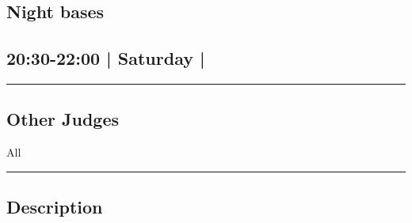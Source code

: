 \documentclass[10pt, A5]{article}
\begin{document}
	

		\begin{framed}
			\begin{minipage}{\textwidth}

			\setcounter{section}{74}
							\section{Night bases}
						
			\subsection*{20:30-22:00 | Saturday | }

			\vspace{0.25cm}
			\hrule
			\vspace{0.25cm}


			\subsection*{Other Judges}
							All

					\vspace{0.25cm}
			\hrule
			\vspace{0.25cm}

			\begin{minipage}{\textwidth}
			\subsection*{\faListAlt \: Description}
			
			\end{minipage}


	\end{minipage}
	\end{framed}

	
\end{document}
